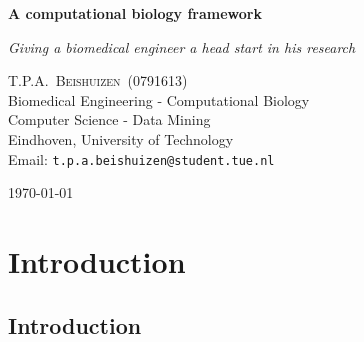 \documentclass[10pt,a4paper]{report}
\newcommand{\documenttitle}{A computational biology framework}
\newcommand{\documentsubtitle}{Giving a biomedical engineer a head start in his research}
\begin{document}
	
	\begin{titlepage}
		
		\center
		
		\vspace*{3cm}
		
		\textbf{\huge \documenttitle}
		
		\textit{\LARGE \documentsubtitle}
		
		\vspace*{2cm}
		
		\large
		\centering
		T.P.A.~\textsc{Beishuizen}~(0791613)\\
		Biomedical Engineering - Computational Biology\\
		Computer Science - Data Mining\\
		Eindhoven, University of Technology\\
		Email: \texttt{t.p.a.beishuizen@student.tue.nl}
		
		\vfill
		
		\vspace*{1cm}
		
		\today
		
	\end{titlepage}
	
	\tableofcontents
	
	
	\pagestyle{fancy}
	\fancyhead{} %
	\fancyfoot{} %
	\renewcommand{\headrulewidth}{0.4pt}
	\renewcommand{\footrulewidth}{0.4pt}
	
	\fancyhead[L]{\rightmark}
	\fancyfoot[C]{\thepage}
	
	
	\clearpage
	
	\chapter{Introduction}
	\label{chap:Introduction}
	
	\section{Introduction}
	\label{IDsec:Introduction}
	
\end{document}
